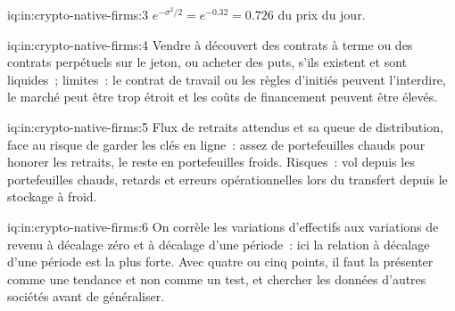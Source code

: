 \begin{solution}{iq:in:crypto-native-firms:3}
$e^{-\sigma^2/2}=e^{-0.32}=0.726$ du prix du jour.
\end{solution}

\begin{solution}{iq:in:crypto-native-firms:4}
Vendre à découvert des contrats à terme ou des contrats perpétuels sur le jeton, ou acheter des puts, s'ils existent et sont liquides~; limites~: le contrat de travail ou les règles
d'initiés peuvent l'interdire, le marché peut être trop étroit et les coûts de financement peuvent être élevés.
\end{solution}

\begin{solution}{iq:in:crypto-native-firms:5}
Flux de retraits attendus et sa queue de distribution, face au risque de garder les clés en ligne~: assez de portefeuilles chauds pour honorer
les retraits, le reste en portefeuilles froids. Risques~: vol depuis les portefeuilles chauds, retards et erreurs opérationnelles lors du transfert depuis le stockage à froid.
\end{solution}

\begin{solution}{iq:in:crypto-native-firms:6}
On corrèle les variations d'effectifs aux variations de revenu à décalage zéro et à décalage d'une période~: ici la relation à décalage d'une période est la plus forte. Avec
quatre ou cinq points, il faut la présenter comme une tendance et non comme un test, et chercher les données d'autres sociétés avant de généraliser.
\end{solution}

